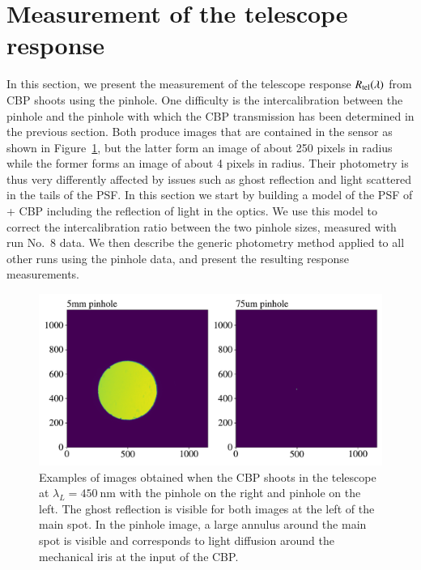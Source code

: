 \section{Measurement of the \SD telescope response}
\label{sec:rsd}
\label{sec:sd_datadesc}

In this section, we present the measurement of the \SD{} telescope response $R_{\mathrm{tel}}(\lambda)$ from CBP shoots using the \spinhole pinhole. One difficulty is the intercalibration between the \spinhole pinhole and the \bpinhole pinhole with which the CBP transmission has been determined in the previous section. Both produce images that are contained in the \SD sensor as shown in Figure~\ref{fig:ccd_examples}, but the latter form an image of about 250 pixels in radius while the former forms an image of about 4 pixels in radius. Their photometry is thus very differently affected by issues such as ghost reflection and light scattered in the tails of the PSF. In this section we start by building a model of the PSF of \SD+ CBP  including the reflection of light in the optics. We use this model to correct the intercalibration ratio between the two pinhole sizes, measured with run No.~8 data. We then describe the generic photometry method applied to all other runs using the \spinhole pinhole data, and present the resulting response measurements.   

\begin{figure}[h]
    \centering
    \includegraphics[width=\columnwidth]{fig/ccd_examples.pdf}
    \caption{Examples of images obtained when the CBP shoots in the \SD telescope at $\lambda_L=\SI{450}{\nm}$ with the \bpinhole pinhole on the right and \spinhole pinhole on the left. The ghost reflection is visible for both images at the left of the main spot. In the \bpinhole pinhole image, a large annulus around the main spot is visible and corresponds to light diffusion around the mechanical iris at the input of the CBP.}
    \label{fig:ccd_examples}
\end{figure}


